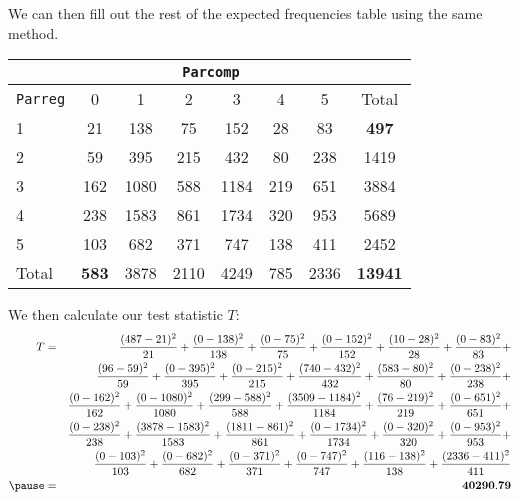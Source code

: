 \documentclass[handout]{beamer}
\begin{document}
\begin{frame}
We can then fill out the rest of the expected frequencies table using
the same method.
\pause
\footnotesize
\begin{table}
\begin{center}
\begin{tabular}{l|cccccc|c}
& \multicolumn{6}{c}{{\tt Parcomp}} & \\
\hline
{\tt Parreg} & 0 & 1 & 2 & 3 & 4 & 5 & Total\\
\hline
1 & 21 & 138 & 75 & 152 & 28 & 83 & \textbf{497} \\
2 & 59 & 395 & 215 & 432 & 80 & 238 & 1419\\
3 & 162 & 1080 & 588 & 1184 & 219 & 651 & 3884\\
4 & 238 & 1583 & 861 & 1734 & 320 & 953 & 5689\\
5 & 103 & 682 & 371 & 747 & 138 & 411 & 2452\\
\hline
Total & \textbf{583} & 3878 & 2110 & 4249 & 785 & 2336 & \textbf{13941}\\
\end{tabular}
\end{center}
\end{table}
\normalsize
\end{frame}

\begin{frame}[fragile]
We then calculate our test statistic $T$:
\pause
\tiny
\begin{eqnarray*}
T &=& \frac{(487-21)^2}{21} + \frac{(0-138)^2}{138} +
\frac{(0-75)^2}{75} + \frac{(0-152)^2}{152} + \frac{(10-28)^2}{28} +
\frac{(0-83)^2}{83} + \\
&\phantom{=}& \frac{(96-59)^2}{59} + \frac{(0-395)^2}{395} +
\frac{(0-215)^2}{215} + \frac{(740-432)^2}{432} + \frac{(583-80)^2}{80} +
\frac{(0-238)^2}{238} + \\
&\phantom{=}& \frac{(0-162)^2}{162} + \frac{(0-1080)^2}{1080} +
\frac{(299-588)^2}{588} + \frac{(3509-1184)^2}{1184} + \frac{(76-219)^2}{219} +
\frac{(0-651)^2}{651} + \\
&\phantom{=}& \frac{(0-238)^2}{238} + \frac{(3878-1583)^2}{1583} +
\frac{(1811-861)^2}{861} + \frac{(0-1734)^2}{1734} + \frac{(0-320)^2}{320} +
\frac{(0-953)^2}{953} + \\
&\phantom{=}& \frac{(0-103)^2}{103} + \frac{(0-682)^2}{682} +
\frac{(0-371)^2}{371} + \frac{(0-747)^2}{747} + \frac{(116-138)^2}{138} +
\frac{(2336-411)^2}{411} \\
\pause
&=& \mathbf{40290.79}
\end{eqnarray*}
\normalsize
\end{frame}
\end{document}
